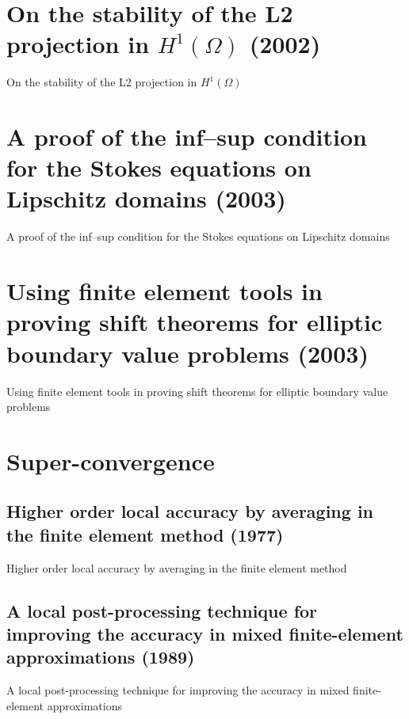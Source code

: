 \section{On the stability of the L2 projection in $H^1(\Omega)$ (2002)}
On the stability of the L2 projection in $H^1(\Omega)$\cite{bramble2002stability}


\section{A proof of the inf--sup condition for the Stokes equations on Lipschitz domains (2003)}
A proof of the inf--sup condition for the Stokes equations on Lipschitz domains\cite{bramble2003proof}


\section{Using finite element tools in proving shift theorems for elliptic boundary value problems (2003)}
Using finite element tools in proving shift theorems for elliptic boundary value problems\cite{bacuta2003using}



\section{Super-convergence}

\subsection{Higher order local accuracy by averaging in the finite element method (1977)}
Higher order local accuracy by averaging in the finite element method\cite{bramble1977higher}


\subsection{A local post-processing technique for improving the accuracy in mixed finite-element approximations (1989)}
A local post-processing technique for improving the accuracy in mixed finite-element approximations\cite{bramble1989local}



%

%


